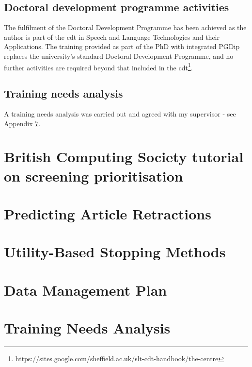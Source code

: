 \documentclass[10pt,oneside]{book}
\begin{document}
\section{Doctoral development programme activities}

The fulfilment of the Doctoral Development Programme has been achieved as the author is part of the \gls*{cdt} in Speech and Language Technologies and their Applications. The training provided as part of the PhD with integrated PGDip replaces the university's standard Doctoral Development Programme, and no further activities are required beyond that included in the \gls*{cdt}\footnote{https://sites.google.com/sheffield.ac.uk/slt-cdt-handbook/the-centre}.

\section{Training needs analysis}

A training needs analysis was carried out and agreed with my supervisor - see Appendix \ref{app:tna}.

\printbibliography[title={References}]

\appendix
\appendixpage 

\chapter{British Computing Society tutorial on screening prioritisation}

\label{app:Screening_Prioritisation}

\chapter{Predicting Article Retractions}

\label{app:Predicting_article_retractions}

\chapter{Utility-Based Stopping Methods}

\label{app:Utility_Based_Stopping_Methods}

\chapter{Data Management Plan}\label{app:dmp}


\chapter{Training Needs Analysis}\label{app:tna}

\end{document}
